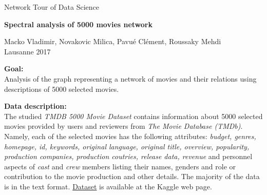 \documentclass[12pt,a4paper]{report}
\begin{document}


\pagestyle{empty}
\begin{center}


Network Tour of Data Science

\medskip





\vspace{5mm}

{\LARGE\bfseries Spectral analysis of 5000 movies network}


\vspace{5mm}

{\large Macko Vladimir, Novakovic Milica, Pavu{\'e} Cl{\'e}ment, Roussaky Mehdi}
\\Lausanne 2017
\vspace{5mm}

\end{center}
 \linenumbers \textbf{Goal:}\\ Analysis of the graph representing a network of movies and their relations using descriptions of 5000 selected movies. 

\vspace{5mm}

\noindent \textbf{Data description:}\\ The studied \textit{TMDB 5000 Movie Dataset} contains information about 5000 selected movies provided by users and reviewers from \textit{The Movie Database (TMDb)}.  Namely, each of the selected movies has the following attributes: \textit{budget, genres, homepage, id, keywords, original language, original title, overview, popularity, production companies, production coutries, release data, revenue} and personnel aspects of \textit{cast} and \textit{crew} members listing their names, genders and role or contribution to the movie production and other details. The majority of the data is in the text format. \href{<https://www.kaggle.com/tmdb/tmdb-movie-metadata/data>}{Dataset} is available at the Kaggle web page.
\vspace{5mm}
\end{document}
